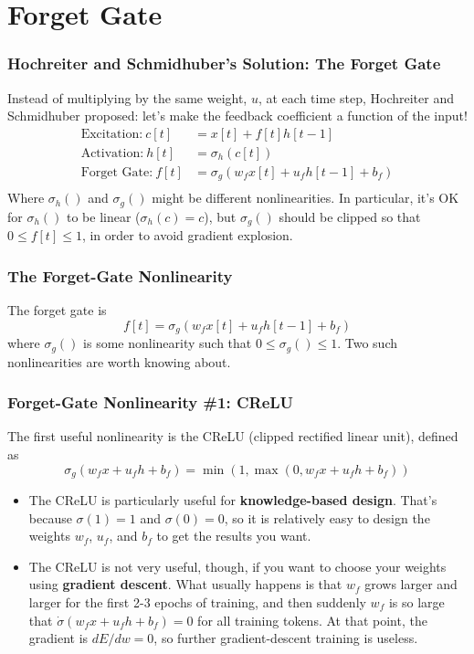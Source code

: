 \documentclass{beamer}
\begin{document}
\section[Forget Gate]{Forget Gate}
\setcounter{subsection}{1}

\begin{frame}
  \frametitle{Hochreiter and Schmidhuber's Solution: The Forget Gate}

  Instead of multiplying by the same weight, $u$, at each time step,
  Hochreiter and Schmidhuber proposed: let's make the feedback
  coefficient a function of the input!
  \begin{align*}
    \mbox{Excitation:}~c[t] &= x[t]+f[t]h[t-1]\\
    \mbox{Activation:}~h[t] &= \sigma_h\left(c[t]\right)\\
    \mbox{Forget Gate:}~f[t] &= \sigma_g\left(w_fx[t]+u_fh[t-1]+b_f\right)\\
  \end{align*}
  Where $\sigma_h()$ and $\sigma_g()$ might be different
  nonlinearities.  In particular, it's OK for $\sigma_h()$ to be
  linear ($\sigma_h(c)=c$), but $\sigma_g()$ should be clipped so that
  $0\le f[t]\le 1$, in order to avoid gradient explosion.
\end{frame}

\begin{frame}
  \frametitle{The Forget-Gate Nonlinearity}
  The forget gate is
  \[
  f[t] = \sigma_g\left(w_fx[t]+u_fh[t-1]+b_f\right)
  \]
  where $\sigma_g()$ is some nonlinearity such that $0\le \sigma_g() \le
  1$.  Two such nonlinearities are worth knowing about.
\end{frame}
\begin{frame}
  \frametitle{Forget-Gate Nonlinearity \#1: CReLU}

  The first useful nonlinearity is the CReLU (clipped rectified linear
  unit), defined as
  \[
  \sigma_g(w_fx+u_fh+b_f) = \min\left(1,\max\left(0,w_fx+u_fh+b_f\right)\right)
  \]
  \begin{itemize}
    \item The CReLU is particularly useful for {\bf knowledge-based
      design}.  That's because $\sigma(1)=1$ and $\sigma(0)=0$, so it
      is relatively easy to design the weights $w_f$, $u_f$, and $b_f$
      to get the results you want.
    \item The CReLU is not very useful, though, if you want to choose
      your weights using {\bf gradient descent}.  What usually happens
      is that $w_f$ grows larger and larger for the first 2-3 epochs
      of training, and then suddenly $w_f$ is so large that
      $\dot\sigma(w_fx+u_fh+b_f)=0$ for all training tokens.  At that
      point, the gradient is $dE/dw=0$, so further gradient-descent
      training is useless.
  \end{itemize}
\end{frame}
\end{document}

